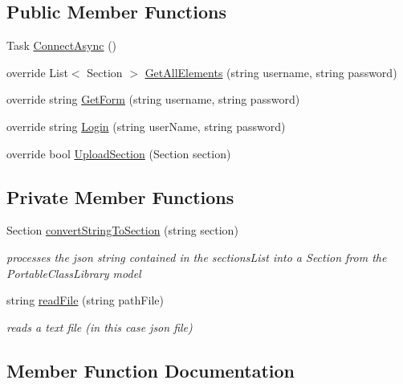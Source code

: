 \subsection*{Public Member Functions}
\begin{DoxyCompactItemize}
\item 
Task \hyperlink{class_wcf_service1_1_1_implementation___mock_aeee2fcebb9cfd636b4ead332f500273c}{Connect\+Async} ()
\item 
override List$<$ Section $>$ \hyperlink{class_wcf_service1_1_1_implementation___mock_a3677cf44f7acac9549f1e58ce9191e4e}{Get\+All\+Elements} (string username, string password)
\item 
override string \hyperlink{class_wcf_service1_1_1_implementation___mock_a770d195f0883f20e2356381152a6ea00}{Get\+Form} (string username, string password)
\item 
override string \hyperlink{class_wcf_service1_1_1_implementation___mock_ad4676c509d48e01e7ed6e2962fc01b29}{Login} (string user\+Name, string password)
\item 
override bool \hyperlink{class_wcf_service1_1_1_implementation___mock_aacbbae5d5cd842b1c62cfab84168b287}{Upload\+Section} (Section section)
\end{DoxyCompactItemize}
\subsection*{Private Member Functions}
\begin{DoxyCompactItemize}
\item 
Section \hyperlink{class_wcf_service1_1_1_implementation___mock_a8cc683e1ef69f6d291c8b0381163d69b}{convert\+String\+To\+Section} (string section)
\begin{DoxyCompactList}\small\item\em processes the json string contained in the sections\+List into a Section from the Portable\+Class\+Library model \end{DoxyCompactList}\item 
string \hyperlink{class_wcf_service1_1_1_implementation___mock_a137882a409681590c57f58b259d1e6cb}{read\+File} (string path\+File)
\begin{DoxyCompactList}\small\item\em reads a text file (in this case json file) \end{DoxyCompactList}\end{DoxyCompactItemize}


\subsection{Member Function Documentation}
